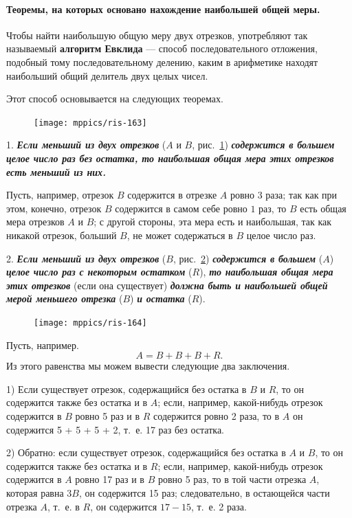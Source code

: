 \documentclass[oneside]{book}
\begin{document}
\paragraph{Теоремы, на которых основано нахождение наибольшей общей меры.}\label{1938/146}
Чтобы найти наибольшую общую меру двух отрезков, употребляют так называемый \textbf{алгоритм Евклида} — способ последовательного отложения, подобный тому последовательному делению, каким в арифметике находят наибольший общий делитель двух целых чисел. 

Этот способ основывается на следующих теоремах.

\begin{figure}
\centering
\texttt{[image: mppics/ris-163]}
\caption{}\label{1938/ris-163}
\end{figure}

1.
\textbf{\emph{Если меньший из двух отрезков}} ($A$ и $B$, рис.~\ref{1938/ris-163}) \textbf{\emph{содержится в большем целое число раз без остатка, то наибольшая общая мера этих отрезков есть меньший из них.}}

Пусть, например, отрезок $B$ содержится в отрезке $A$ ровно $3$ раза;
так как при этом, конечно, отрезок $B$ содержится в самом себе ровно $1$ раз, то $B$ есть общая мера отрезков $A$ и $B$;
с другой стороны, эта мера есть и наибольшая, так как никакой отрезок, больший $B$, не может содержаться в $B$ целое число раз.

2.
\textbf{\emph{Если меньший из двух отрезков}} ($B$, рис.~\ref{1938/ris-164}) \textbf{\emph{содержится в большем}} ($A$) \textbf{\emph{целое число раз с некоторым остатком}} ($R$), \textbf{\emph{то наибольшая общая мера этих отрезков}} (если она существует) \textbf{\emph{должна быть и наибольшей общей мерой меньшего отрезка}} ($B$) \textbf{\emph{и остатка}} ($R$).

\begin{figure}
\centering
\texttt{[image: mppics/ris-164]}
\caption{}\label{1938/ris-164}
\end{figure}

Пусть, например.
\[A=B+B+B+R.\]
Из этого равенства мы можем вывести следующие два заключения.

1) Если существует отрезок, содержащийся без остатка в $B$ и $R$, то он содержится также без остатка и в $A$;
если, например, какой-нибудь отрезок содержится в $B$ ровно 5 раз и в $R$ содержится ровно 2 раза, то в $A$ он содержится 5 + 5 + 5 + 2, т.~е. 17 раз без остатка.

2) Обратно:
если существует отрезок, содержащийся без остатка в $A$ и $B$, то он содержится также без остатка и в $R$;
если, например, какой-нибудь отрезок содержится в $A$ ровно 17 раз и в $B$ ровно 5 раз, то в той части отрезка $A$, которая равна $3B$, он содержится 15 раз;
следовательно, в остающейся части отрезка $A$, т.~е. в $R$, он содержится $17-15$, т.~е. 2 раза.
\end{document}
